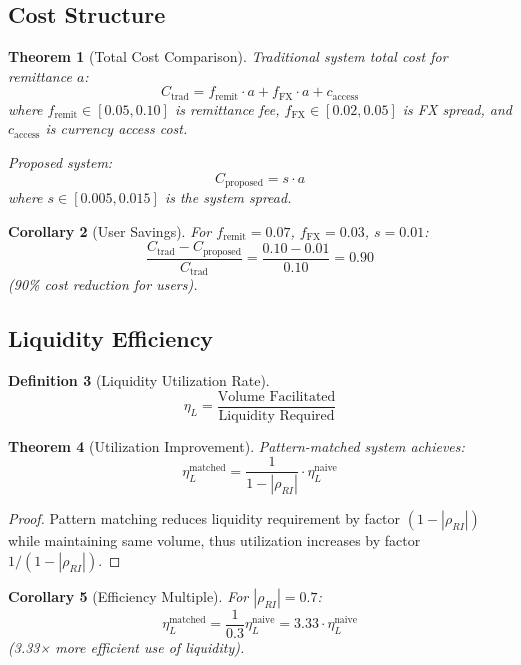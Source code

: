 \documentclass[12pt]{article}
\newtheorem{theorem}{Theorem}
\newtheorem{definition}[theorem]{Definition}
\newtheorem{corollary}[theorem]{Corollary}
\begin{document}
\subsection{Cost Structure}

\begin{theorem}[Total Cost Comparison]
Traditional system total cost for remittance $a$:
$$
C_{\text{trad}} = f_{\text{remit}} \cdot a + f_{\text{FX}} \cdot a + c_{\text{access}}
$$
where $f_{\text{remit}} \in [0.05, 0.10]$ is remittance fee, $f_{\text{FX}} \in [0.02, 0.05]$ is FX spread, and $c_{\text{access}}$ is currency access cost.

Proposed system:
$$
C_{\text{proposed}} = s \cdot a
$$
where $s \in [0.005, 0.015]$ is the system spread.
\end{theorem}

\begin{corollary}[User Savings]
For $f_{\text{remit}} = 0.07$, $f_{\text{FX}} = 0.03$, $s = 0.01$:
$$
\frac{C_{\text{trad}} - C_{\text{proposed}}}{C_{\text{trad}}} = \frac{0.10 - 0.01}{0.10} = 0.90
$$
(90\% cost reduction for users).
\end{corollary}

\subsection{Liquidity Efficiency}

\begin{definition}[Liquidity Utilization Rate]
$$
\eta_L = \frac{\text{Volume Facilitated}}{\text{Liquidity Required}}
$$
\end{definition}

\begin{theorem}[Utilization Improvement]
Pattern-matched system achieves:
$$
\eta_L^{\text{matched}} = \frac{1}{1-|\rho_{RI}|} \cdot \eta_L^{\text{naive}}
$$
\end{theorem}

\begin{proof}
Pattern matching reduces liquidity requirement by factor $(1-|\rho_{RI}|)$ while maintaining same volume, thus utilization increases by factor $1/(1-|\rho_{RI}|)$.
\end{proof}

\begin{corollary}[Efficiency Multiple]
For $|\rho_{RI}| = 0.7$:
$$
\eta_L^{\text{matched}} = \frac{1}{0.3} \eta_L^{\text{naive}} = 3.33 \cdot \eta_L^{\text{naive}}
$$
(3.33× more efficient use of liquidity).
\end{corollary}
\end{document}
